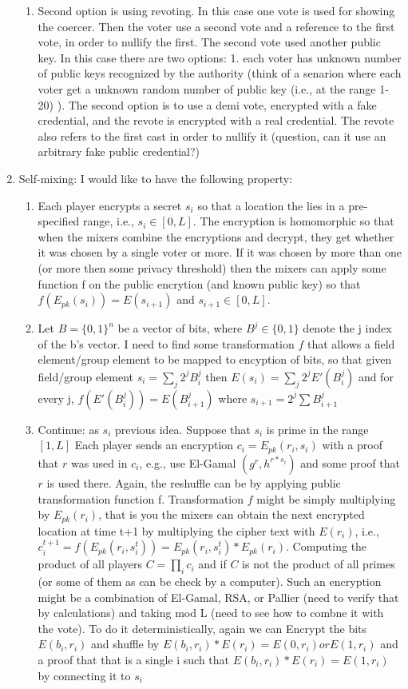 \documentclass[]{paper}
\begin{document}
\begin{enumerate}
\begin{enumerate}
		\item  Second option is using revoting.  In this case one vote is used for showing the coercer. Then the voter use a second vote and a reference to the first vote, in order to nullify the first. The second vote used another public key. In this case there are two options: 1. each voter has unknown number of public keys recognized by the authority (think of a senarion where each voter get a unknown random number of public key  (i.e., at the range 1-20) ). The second option is to use a demi vote, encrypted with a fake credential, and the revote is encrypted with a real credential. The revote also refers to the first cast in order to nullify it (question, can it use an arbitrary fake public credential?)
	\end{enumerate}
	\item Self-mixing: I would like to have the following property: 
	\begin{enumerate}
	\item Each player encrypts a secret $s_i$ so that a location the lies in a pre-specified range, i.e., $s_i\in [0,L]$. The encryption is homomorphic so that when the mixers combine the encryptions and decrypt, they get whether it was chosen by a single voter or more. If it was chosen by more than one (or more then some privacy threshold) then the mixers can apply some function f on the public encrytion (and known public key) so that $f(E_{pk}(s_i)) = E(s_{i+1})$ and $s_{i+1}\in [0,L]$. 
	\item Let $B = \{0,1\}^n$ be a vector of bits, where $B^j\in \{0,1\}$ denote the j index of the b's vector. I need to find some transformation $f$ that allows a field element/group element to be mapped to encyption of bits, so that given field/group element $s_i =\sum_j 2^j  B^j_i $ then $E(s_i) = \sum_j 2^j E'( B^j_i)$ and for every j, $f(E'( B^j_i)) = E( B^j_{i+1})$ where  $s_{i+1} = 2^j \sum  B^j_{i+1}$ 
	\item Continue:  as $s_i$ previous idea. Suppose that $s_i$ is prime in the range $[1,L]$
	Each player sends an encryption $c_i= E_{pk}(r_i,s_i)$ with a proof that $r$ was used in $c_i$, e.g., use El-Gamal $(g^r, h^{r*s_i})$ and some proof that $r$ is used there.  Again,  the reshuffle can be by applying public transformation function f.  Transformation $f$ might be simply  multiplying by $E_{pk}(r_i)$, that is you the mixers can obtain the next encrypted location at time t+1 by multiplying the cipher text with $E(r_i)$, i.e., $c^{t+1}_i = f(E_{pk}(r_i,s^t_i))=E_{pk}(r_i,s^t_i)*E_{pk}(r_i)$. Computing the product of all players $C = \prod_i c_i$ and if $C$ is not the product of all primes (or some of them as can be check by a computer). Such an encryption might be a combination of El-Gamal, RSA, or Pallier (need to verify that by calculations) and taking mod L (need to see how to combne it with the vote). To do it deterministically, again we can Encrypt the bits $E(b_i, r_i)$ and shuffle by $E(b_i,r_i)*E(r_i) = E(0,r_i) or E(1,r_i)$ and a proof that that is a single i such that $E(b_i,r_i)*E(r_i)=E(1,r_i)$ by connecting it to $s_i$ 
\end{enumerate}


\end{enumerate}
\end{document}
